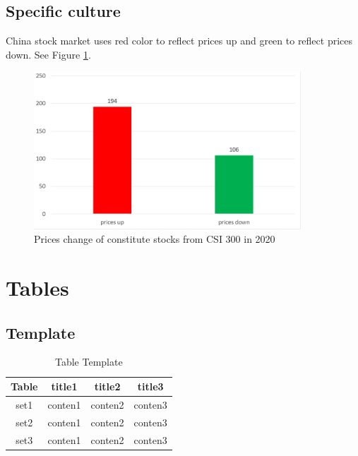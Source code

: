 \documentclass{article}
\begin{document}
\subsection{Specific culture}
China stock market uses red color to reflect prices up and green to reflect prices down. See Figure \ref{Sculture}.  
\begin{figure}[htbp]
    \centering
    \includegraphics[width = 10cm]{stock.PNG}
    \caption{Prices change of constitute stocks from CSI 300 in 2020}
    \label{Sculture}
\end{figure}

\newpage
\section{Tables}

\subsection{Template}
\begin{table}[htbp]
\centering
\begin{tabular}{|c|c|c|c|}
\hline
Table&title1&title2&title3\\ 
\hline
set1&conten1&conten2&conten3\\ 
\hline 
set2&conten1&conten2&conten3\\ 
\hline 
set3&conten1&conten2&conten3\\
\hline
\end{tabular}
\caption{Table Template}
\end{table}
\end{document}
